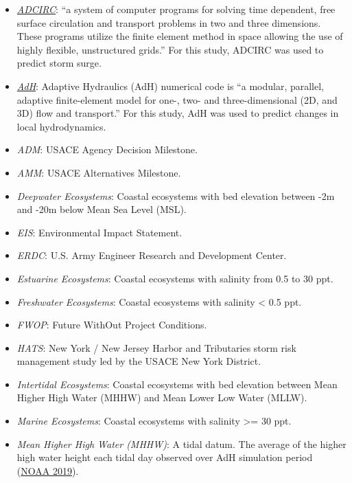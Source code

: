 \documentclass[
]{book}
\providecommand{\tightlist}{%
  \setlength{\itemsep}{0pt}\setlength{\parskip}{0pt}}
\begin{document}
\begin{itemize}
\tightlist
\item
  \emph{\href{https://adcirc.org/}{ADCIRC}}: ``a system of computer programs for solving time dependent, free surface circulation and transport problems in two and three dimensions. These programs utilize the finite element method in space allowing the use of highly flexible, unstructured grids.'' For this study, ADCIRC was used to predict storm surge.
\item
  \emph{\href{https://www.erdc.usace.army.mil/Media/Fact-Sheets/Fact-Sheet-Article-View/Article/476708/ada/}{AdH}}: Adaptive Hydraulics (AdH) numerical code is ``a modular, parallel, adaptive finite-element model for one-, two- and three-dimensional (2D, and 3D) flow and transport.'' For this study, AdH was used to predict changes in local hydrodynamics.
\item
  \emph{ADM}: USACE Agency Decision Milestone.
\item
  \emph{AMM}: USACE Alternatives Milestone.
\item
  \emph{Deepwater Ecosystems}: Coastal ecosystems with bed elevation between -2m and -20m below Mean Sea Level (MSL).
\item
  \emph{EIS}: Environmental Impact Statement.
\item
  \emph{ERDC}: U.S. Army Engineer Research and Development Center.\\
\item
  \emph{Estuarine Ecosystems}: Coastal ecosystems with salinity from 0.5 to 30 ppt.
\item
  \emph{Freshwater Ecosystems}: Coastal ecosystems with salinity \textless{} 0.5 ppt.
\item
  \emph{FWOP}: Future WithOut Project Conditions.
\item
  \emph{HATS}: New York / New Jersey Harbor and Tributaries storm risk management study led by the USACE New York District.\\
\item
  \emph{Intertidal Ecosystems}: Coastal ecosystems with bed elevation between Mean Higher High Water (MHHW) and Mean Lower Low Water (MLLW).
\item
  \emph{Marine Ecosystems}: Coastal ecosystems with salinity \textgreater{}= 30 ppt.
\item
  \emph{Mean Higher High Water (MHHW)}: A tidal datum. The average of the higher high water height each tidal day observed over AdH simulation period (\href{https://shoreline.noaa.gov/glossary.html}{NOAA 2019}).

\end{itemize}
\end{document}
